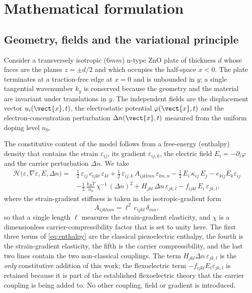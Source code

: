 \section{Mathematical formulation}
\label{sec:governing}

\subsection{Geometry, fields and the variational principle}
\label{sec:governing_variational}

Consider a transversely isotropic ($6mm$) n-type ZnO plate of thickness $d$
whose faces are the planes $z=\pm d/2$ and which occupies the half-space
$x<0$.  The plate terminates at a traction-free edge at $x=0$ and is unbounded
in $y$; a single tangential wavenumber $k_y$ is conserved because the geometry
and the material are invariant under translations in $y$.  The independent
fields are the displacement vector $u_i(\vect{x},t)$, the electrostatic
potential $\varphi(\vect{x},t)$ and the electron-concentration perturbation
$\Delta n(\vect{x},t)$ measured from the uniform doping level $n_0$.

The constitutive content of the model follows from a free-energy (enthalpy)
density that contains the strain $\varepsilon_{ij}$, its gradient
$\varepsilon_{ij,k}$, the electric field $E_i=-\partial_i\varphi$ and the carrier
perturbation $\Delta n$.  We take
\begin{equation}
\label{eq:enthalpy}
\begin{aligned}
\mathcal{H}\bigl(\varepsilon,\nabla\varepsilon,E,\Delta n\bigr)
={}&\tfrac12\,\varepsilon_{ij}\,c_{ijkl}\,\varepsilon_{kl}
+\tfrac12\,\varepsilon_{ij,k}\,A_{ijklmn}\,\varepsilon_{lm,n}
-\tfrac12\,E_i\,\kappa_{ij}\,E_j
-e_{kij}E_k\varepsilon_{ij}\\
&-\tfrac12\,\frac{k_BT}{n_0}\,\chi^{-1}\,(\Delta n)^2
+H_{jkl}\,\Delta n\,\varepsilon_{jk,l}
-f_{ijkl}\,E_i\,\varepsilon_{jk,l},
\end{aligned}
\end{equation}
where the strain-gradient stiffness is taken in the isotropic-gradient form
\begin{equation}
\label{eq:A_tensor}
A_{ijklmn}=\ell^{2}\,c_{ijkl}\,\delta_{mn},
\end{equation}
so that a single length $\ell$ measures the strain-gradient elasticity, and
$\chi$ is a dimensionless carrier-compressibility factor that is set to unity
here.  The first three terms of \eqref{eq:enthalpy} are the classical
piezoelectric enthalpy, the fourth is the strain-gradient elasticity, the fifth
is the carrier compressibility, and the last two lines contain the two
non-classical couplings.  The term $H_{jkl}\Delta n\,\varepsilon_{jk,l}$ is the
\emph{only} constitutive addition of this work; the flexoelectric term
$-f_{ijkl}E_i\varepsilon_{jk,l}$ is retained because it is part of the
established flexoelectric theory that the carrier coupling is being added to.
No other coupling, field or gradient is introduced.

